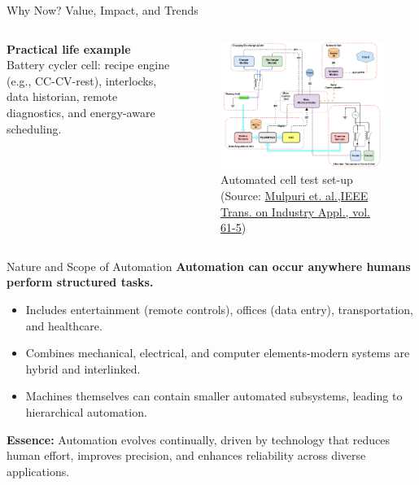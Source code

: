 \begin{frame}{Why Now? Value, Impact, and Trends}
	\begin{columns}
		\begin{column}{0.25\textwidth}
			\textbf{Practical life example}\\
				Battery cycler cell: recipe engine (e.g., CC-CV-rest), interlocks, data historian, remote diagnostics, and energy-aware scheduling.
		\end{column}
		\begin{column}{0.75\textwidth}
				\begin{figure}
				\centering
				\includegraphics[width=0.7\linewidth]{fig/lec01/cell_test_automation.png}
				\caption*{Automated cell test set-up (Source: \href{https://doi.org/10.1109/TIA.2025.3561705}{Mulpuri et. al.,IEEE Trans. on Industry Appl., vol. 61-5})}
			\end{figure}
		\end{column}
\end{columns}
\end{frame}


\begin{frame}{Nature and Scope of Automation}
\textbf{Automation can occur anywhere humans perform structured tasks.}
\begin{itemize}
  \item Includes entertainment (remote controls), offices (data entry), transportation, and healthcare.
  \item Combines mechanical, electrical, and computer elements-modern systems are hybrid and interlinked.
  \item Machines themselves can contain smaller automated subsystems, leading to hierarchical automation.
\end{itemize}

\vspace{3mm}
\textbf{Essence:}  
Automation evolves continually, driven by technology that reduces human effort, improves precision, and enhances reliability across diverse applications.
\end{frame}

